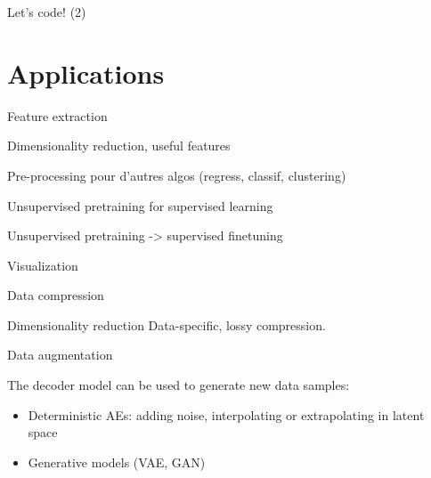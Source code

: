 \documentclass{beamer}
\begin{document}
  \begin{frame}{Let's code! (2)}


    
  \end{frame}

  \section{Applications}

  \begin{frame}{Feature extraction}

    Dimensionality reduction, useful features

    Pre-processing pour d'autres algos (regress, classif, clustering)
    
  \end{frame}

  \begin{frame}{Unsupervised pretraining for supervised learning}
    
    Unsupervised pretraining -> supervised finetuning

    \cite{Erhan2010}

  \end{frame}

  \begin{frame}{Visualization}
    
  \end{frame}

  \begin{frame}{Data compression}
    
    Dimensionality reduction
    Data-specific, lossy compression.

  \end{frame}  

  \begin{frame}{Data augmentation}

    The decoder model can be used to \alert{generate new data samples}:

    \begin{itemize}
      \item Deterministic AEs: adding noise, interpolating or extrapolating in latent space \cite{Devries2017}
      \item Generative models (VAE, GAN)
    \end{itemize}

  \end{frame}
\end{document}
